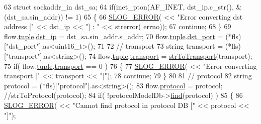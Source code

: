 \begin{DoxyCode}
{63             \textcolor{keyword}{struct }sockaddr\_in dst\_sa;
64             \textcolor{keywordflow}{if}(inet\_pton(AF\_INET, dst\_ip.c\_str(), &(dst\_sa.sin\_addr)) != 1)
65             \{
66                 \hyperlink{_logger_8h_a2a8694cd392d18f4db6b9cc9f15bafe3}{SLOG\_ERROR}( << \textcolor{stringliteral}{"Error converting dst address ["} << dst\_ip << \textcolor{stringliteral}{"] : "} << strerror(
      errno));
67                 \textcolor{keywordflow}{continue};
68             \}
69             flow.\hyperlink{class_vsid_training_1_1_training_flow_a687b85a2f6d23cb0ea63f61637df5bcf}{tuple}.\hyperlink{class_vsid_common_1_1_i_pv4_tuple_a21ace381c0b90771659095178d0f15af}{dst\_ip} = dst\_sa.sin\_addr.s\_addr;
70             flow.\hyperlink{class_vsid_training_1_1_training_flow_a687b85a2f6d23cb0ea63f61637df5bcf}{tuple}.\hyperlink{class_vsid_common_1_1_i_pv4_tuple_a1c1d101406314b12ce43cc1d54177736}{dst\_port} = (*fls)[\textcolor{stringliteral}{"dst\_port"}].as<uint16\_t>();
71 
72             \textcolor{comment}{// transport}
73             \textcolor{keywordtype}{string} transport = (*fls)[\textcolor{stringliteral}{"transport"}].as<\textcolor{keywordtype}{string}>();
74             flow.\hyperlink{class_vsid_training_1_1_training_flow_a687b85a2f6d23cb0ea63f61637df5bcf}{tuple}.\hyperlink{class_vsid_common_1_1_i_pv4_tuple_a39c4c8ec9aaa3f80d17daaefb783beec}{transport} = \hyperlink{class_vsid_training_1_1_training_input_a44bef3969896dadbdb2df4a7af7b1ab2}{strToTransport}(transport);
75             \textcolor{keywordflow}{if}( flow.\hyperlink{class_vsid_training_1_1_training_flow_a687b85a2f6d23cb0ea63f61637df5bcf}{tuple}.\hyperlink{class_vsid_common_1_1_i_pv4_tuple_a39c4c8ec9aaa3f80d17daaefb783beec}{transport} == 0 )
76             \{
77                 \hyperlink{_logger_8h_a2a8694cd392d18f4db6b9cc9f15bafe3}{SLOG\_ERROR}( << \textcolor{stringliteral}{"Error converting transport ["} << transport << \textcolor{stringliteral}{"]"});
78                 \textcolor{keywordflow}{continue};
79             \}
80 
81             \textcolor{comment}{// protocol}
82             \textcolor{keywordtype}{string} protocol = (*fls)[\textcolor{stringliteral}{"protocol"}].as<\textcolor{keywordtype}{string}>();
83             flow.\hyperlink{class_vsid_training_1_1_training_flow_ac4d53b04d9cbf07636611ad9c6be3b95}{protocol} = protocol; \textcolor{comment}{//strToProtocol(protocol);}
84             \textcolor{keywordflow}{if}( !protocolModelDb->\hyperlink{class_vsid_1_1_protocol_model_db_a542f3434c2a9d97ee2632200372a6a88}{find}(protocol) )
85             \{
86                 \hyperlink{_logger_8h_a2a8694cd392d18f4db6b9cc9f15bafe3}{SLOG\_ERROR}( << \textcolor{stringliteral}{"Cannot find protocol in protocol DB ["} << protocol << \textcolor{stringliteral}{"]"});
}
\end{DoxyCode}
